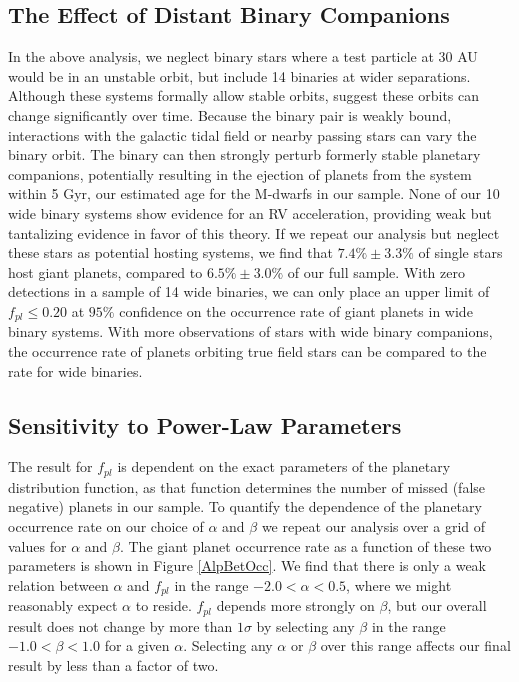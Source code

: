 \subsection{The Effect of Distant Binary Companions}

In the above analysis, we neglect binary stars where a test particle at 30 AU would be in an unstable orbit, but include 14 binaries at wider separations. Although these systems formally allow stable orbits, \citet{Kaib13} suggest these orbits can change significantly over time. Because the binary pair is weakly bound, interactions with the galactic tidal field or nearby passing stars can vary the binary orbit. The binary can then strongly perturb formerly stable planetary companions, potentially resulting in the ejection of planets from the system within 5 Gyr, our estimated age for the M-dwarfs in our sample. None of our 10 wide binary systems show evidence for an RV acceleration, providing weak but tantalizing evidence in favor of this theory. If we repeat our analysis but neglect these stars as potential hosting systems, we find that $7.4\% \pm 3.3\%$ of single stars host giant planets, compared to $6.5\% \pm 3.0\%$ of our full sample. With zero detections in a sample of 14 wide binaries, we can only place an upper limit of $f_{pl} \leq 0.20$ at $95\%$ confidence on the occurrence rate of giant planets in wide binary systems. With more observations of stars with wide binary companions, the occurrence rate of planets orbiting true field stars can be compared to the rate for wide binaries.



\subsection{Sensitivity to Power-Law Parameters}
\label{PL}
The result for $f_{pl}$ is dependent on the exact parameters of the planetary distribution function, as that function determines the number of missed (false negative) planets in our sample. To quantify the dependence of the planetary occurrence rate on our choice of $\alpha$ and $\beta$ we repeat our analysis over a grid of values for $\alpha$ and $\beta$. The giant planet occurrence rate as a function of these two parameters is shown in Figure \ref{AlpBetOcc}. We find that there is only a weak relation between $\alpha$ and $f_{pl}$ in the range $-2.0 < \alpha < 0.5$, where we might reasonably expect $\alpha$ to reside. $f_{pl}$ depends more strongly on $\beta$, but our overall result does not change by more than $1\sigma$ by selecting any $\beta$ in the range $-1.0 < \beta < 1.0$ for a given $\alpha$. Selecting any $\alpha$ or $\beta$ over this range affects our final result by less than a factor of two.

